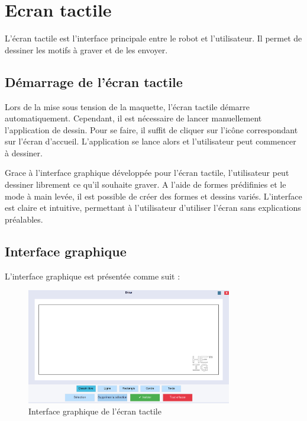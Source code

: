 \section{Ecran tactile}

L'écran tactile est l'interface principale entre le robot et l'utilisateur. Il permet de dessiner les motifs à graver et de les envoyer.

\subsection{Démarrage de l'écran tactile}

Lors de la mise sous tension de la maquette, l'écran tactile démarre automatiquement. Cependant, il est nécessaire de lancer manuellement l'application de dessin. Pour se faire, il suffit de cliquer sur l'icône correspondant sur l'écran d'accueil. L'application se lance alors et l'utilisateur peut commencer à dessiner.

Grace à l'interface graphique développée pour l'écran tactile, l'utilisateur peut dessiner librement ce qu'il souhaite graver. A l'aide de formes prédifinies et le mode à main levée, il est possible de créer des formes et dessins variés. L'interface est claire et intuitive, permettant à l'utilisateur d'utiliser l'écran sans explications préalables.

\subsection{Interface graphique}

L'interface graphique est présentée comme suit :
\begin{figure}[H]
    \centering
    \includegraphics[width=0.8\textwidth]{assets/figures/Draw_app.png}
    \caption{Interface graphique de l'écran tactile}
    \label{fig:interface_graphique}
\end{figure}

